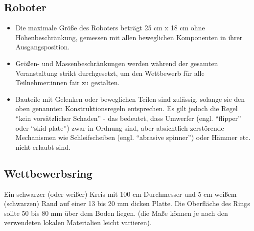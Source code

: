 \documentclass[a4paper,12pt]{article}
\begin{document}
\subsection{Roboter}
\robotRequirements
\begin{itemize}
	\item Die maximale Größe des Roboters beträgt 25 cm x 18 cm ohne
		Höhenbeschränkung, gemessen mit allen beweglichen Komponenten
		in ihrer Ausgangsposition.
	\item Größen- und Massenbeschränkungen werden während der gesamten
		Veranstaltung strikt durchgesetzt, um den Wettbewerb für alle
		Teilnehmer:innen fair zu gestalten.
	\item Bauteile mit Gelenken oder beweglichen Teilen sind zulässig,
		solange sie den oben genannten Konstruktionsregeln entsprechen.
		Es gilt jedoch die Regel "`kein vorsätzlicher Schaden"' - das
		bedeutet, dass Umwerfer (engl. "`flipper"' oder "`skid plate"')
		zwar in Ordnung sind, aber absichtlich zerstörende Mechanismen
		wie Schleifscheiben (engl. "`abrasive spinner"') oder Hämmer
		etc. nicht erlaubt sind.
\end{itemize}

\subsection{Wettbewerbsring}
Ein schwarzer (oder weißer) Kreis mit 100 cm Durchmesser und 5 cm weißem
(schwarzen) Rand auf einer 13 bis 20 mm dicken Platte. Die Oberfläche des Rings
sollte 50 bis 80 mm über dem Boden liegen. (die Maße können je nach den
verwendeten lokalen Materialien leicht variieren).
\\ \vspace{\baselineskip}

\end{document}
